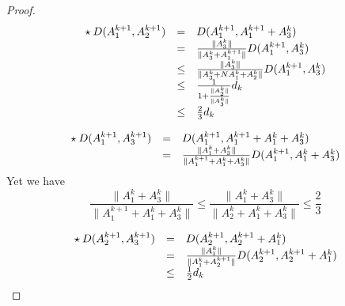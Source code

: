\documentclass[12pt]{article}
\theoremstyle{plain}%
\theoremstyle{definition}
\theoremstyle{remark}
\begin{document}
\begin{proof}

\[
\begin{array}{c c l}
\star \: D(A_1^{k+1},A_2^{k+1}) & = & D(A_1^{k+1},A_1^{k+1}+A_3^k) \\
& = & \frac{\|A_3^k\|}{\|A_3^k+A_1^{k+1}\|}D(A_1^{k+1},A_3^k)\\
& \leq & \frac{\|A_3^k\|}{\|A_3^k+N A_1^k+A_2^k\|}D(A_1^{k+1},A_3^k)\\
& \leq & \frac{1}{1+\frac{\|A_2^k\|}{\|A_3^k\|}} d_k\\
& \leq & \frac{2}{3} d_k
\end{array}
\]

\[
\begin{array}{c c l}
\star \: D(A_1^{k+1},A_3^{k+1}) & = & D(A_1^{k+1},A_1^{k+1}+A_1^k+A_3^k)\\
 & = & \frac{\|A_1^k+A_3^k\|}{\|A_1^{k+1}+A_1^k+A_3^k\|}  D(A_1^{k+1},A_1^k+A_3^k) \\
\end{array}
\]
Yet we have \[
\frac{\|A_1^k+A_3^k\|}{\|A_1^{k+1}+A_1^k+A_3^k\|} \leq \frac{\|A_1^k+A_3^k\|}{\|A_2^k+A_1^k+A_3^k\|} \leq
\frac{2}{3}
\]


\[
\begin{array}{c c l}
\star \: D(A_2^{k+1},A_3^{k+1}) & = & D(A_2^{k+1},A_2^{k+1}+A_1^k) \\
& = &\frac{\|A_1^k\|}{\|A_1^k+A_2^{k+1}\|} D(A_2^{k+1},A_2^{k+1}+A_1^k)\\
& \leq & \frac{1}{2} d_k
\end{array}
\]
\end{proof}
\end{document}
